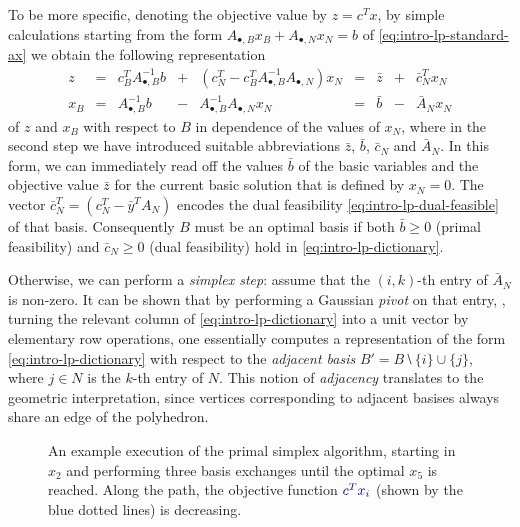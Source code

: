 To be more specific, denoting the objective value by $z=c^Tx$, by simple calculations starting from the form $A_{•,B} x_B + A_{•,N} x_N = b$ of \cref{eq:intro-lp-standard-ax} we obtain the following representation
\begin{equation}
  \begin{array}{ccrcrcccr}
   z   & = & c_B^T A_{•,B}^{-1} b & + & (c_N^T - c_B^T A_{•,B}^{-1} A_{•,N}) x_N 
       & = & \bar z & + & \bar c_N^T x_N\\
   x_B & = &       A_{•,B}^{-1} b & - &                A_{•,B}^{-1} A_{•,N}  x_N
       & = & \bar b & - & \bar A_N x_N
  \end{array}\label{eq:intro-lp-dictionary}
\end{equation}
of $z$ and $x_B$ with respect to $B$ in dependence of the values of $x_N$, where in the second step we have introduced suitable abbreviations $\bar z$, $\bar b$, $\bar c_N$ and $\bar A_N$. In this form, we can immediately read off the values $\bar b$ of the basic variables and the objective value $\bar z$ for the current basic solution that is defined by $x_N=0$. The vector $\bar c_N^T = (c_N^T - \bar y^T A_N)$ encodes the dual feasibility \cref{eq:intro-lp-dual-feasible} of that basis. Consequently $B$ must be an optimal basis if both $\bar b ≥ 0$ (primal feasibility) and $\bar c_N ≥ 0$ (dual feasibility) hold in \cref{eq:intro-lp-dictionary}.

Otherwise, we can perform a \emph{simplex step}: assume that the $(i,k)$-th entry of $\bar A_N$ is non-zero. It can be shown that by performing a Gaussian \emph{pivot} on that entry, \ie, turning the relevant column of \cref{eq:intro-lp-dictionary} into a unit vector by elementary row operations, one essentially computes a representation of the form \cref{eq:intro-lp-dictionary} with respect to the \emph{adjacent basis} $B' = B ⧵ \{i\} ∪ \{j\}$, where $j ∈ N$ is the $k$-th entry of $N$. This notion of \emph{adjacency} translates to the geometric interpretation, since vertices corresponding to adjacent basises always share an edge of the polyhedron.

\begin{figure}
  \centering
  \caption{An example execution of the primal simplex algorithm, starting in $x_2$ and performing \textcolor{path}{three basis exchanges} until the optimal $x_5$ is reached. Along the path, the objective function $\textcolor{objective}{c^T x_i}$ (shown by the blue dotted lines) is decreasing.}
  \label{fig:example-simplex}
\end{figure}

